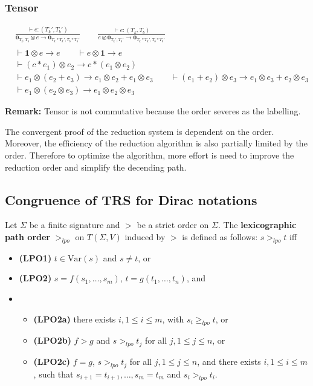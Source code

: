 \subsubsection*{Tensor}
\begin{align*}
  & \frac{\vdash e : (T_k', T_b')}{\textbf{0}_{T_k, T_b} \otimes e \to \textbf{0}_{T_k * T_k', T_b * T_b'}}
  \qquad \frac{\vdash e : (T_k, T_b)}{e \otimes \textbf{0}_{T_k', T_b'} \to \textbf{0}_{T_k * T_k', T_b * T_b'}}\\
  &\ \\
  & \vdash \mathbf{1} \otimes e \to e
  \qquad
  \vdash e \otimes \mathbf{1} \to e\\
  & \vdash (c * e_1) \otimes e_2 \to c * (e_1 \otimes e_2)\\
  & \vdash e_1 \otimes (e_2 + e_3) \to e_1 \otimes e_2 + e_1 \otimes e_3
  \qquad \vdash (e_1 + e_2) \otimes e_3 \to e_1 \otimes e_3 + e_2 \otimes e_3\\
  & \vdash e_1 \otimes (e_2 \otimes e_3) \to e_1 \otimes e_2 \otimes e_3
\end{align*}

\textbf{Remark: } Tensor is not commutative because the order severes as the labelling.
  
  
The convergent proof of the reduction system is dependent on the order. Moreover, the efficiency of the reduction algorithm is also partially limited by the order. Therefore to optimize the algorithm, more effort is need to improve the reduction order and simplify the decending path.

\subsection{Congruence of TRS for Dirac notations}

\begin{definition}[LPO]
  Let $\Sigma$ be a finite signature and $>$ be a strict order on $\Sigma$. The \textbf{lexicographic path order}  $>_{lpo}$ on $T(\Sigma, V)$ induced by $>$ is defined as follows: $s >_{lpo} t$ iff
  \begin{itemize}
    \item \textbf{(LPO1)} $t \in \mathrm{Var}(s)$ and $s \neq t$, or
    \item \textbf{(LPO2)} $s = f(s_1, \dots, s_m)$, $t = g(t_1, \dots, t_n)$, and
    \item \begin{itemize}
      \item \textbf{(LPO2a)} there exists $i, 1\leq i \leq m$, with $s_i \geq_{lpo} t$, or
      \item \textbf{(LPO2b)} $f > g$ and $s >_{lpo} t_j$ for all $j, 1\leq j \leq n$, or
      \item \textbf{(LPO2c)} $f = g$, $s >_{lpo} t_j$ for all $j, 1\leq j \leq n$, and there exists $i, 1 \leq i \leq m$, such that $s_{i+1} = t_{i+1}, \dots, s_m = t_m$ and $s_i >_{lpo} t_i$.
    \end{itemize}
  \end{itemize}
  
\end{definition}


